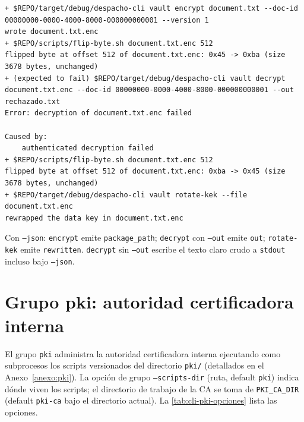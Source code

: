 \begin{lstlisting}[numbers=none]
+ $REPO/target/debug/despacho-cli vault encrypt document.txt --doc-id 00000000-0000-4000-8000-000000000001 --version 1
wrote document.txt.enc
+ $REPO/scripts/flip-byte.sh document.txt.enc 512
flipped byte at offset 512 of document.txt.enc: 0x45 -> 0xba (size 3678 bytes, unchanged)
+ (expected to fail) $REPO/target/debug/despacho-cli vault decrypt document.txt.enc --doc-id 00000000-0000-4000-8000-000000000001 --out rechazado.txt
Error: decryption of document.txt.enc failed

Caused by:
    authenticated decryption failed
+ $REPO/scripts/flip-byte.sh document.txt.enc 512
flipped byte at offset 512 of document.txt.enc: 0xba -> 0x45 (size 3678 bytes, unchanged)
+ $REPO/target/debug/despacho-cli vault rotate-kek --file document.txt.enc
rewrapped the data key in document.txt.enc
\end{lstlisting}

Con \texttt{--json}: \texttt{encrypt} emite \texttt{package\_path}; \texttt{decrypt} con \texttt{--out} emite \texttt{out}; \texttt{rotate-kek} emite \texttt{rewritten}. \texttt{decrypt} sin \texttt{--out} escribe el texto claro crudo a \texttt{stdout} incluso bajo \texttt{--json}.

\section{Grupo pki: autoridad certificadora interna}\label{sec:cli-pki}

El grupo \texttt{pki} administra la autoridad certificadora interna ejecutando como subprocesos los scripts versionados del directorio \texttt{pki/} (detallados en el Anexo~\ref{anexo:pki}). La opción de grupo \texttt{--scripts-dir} (ruta, default \texttt{pki}) indica dónde viven los scripts; el directorio de trabajo de la CA se toma de \texttt{PKI\_CA\_DIR} (default \texttt{pki-ca} bajo el directorio actual). La \cref{tab:cli-pki-opciones} lista las opciones.


